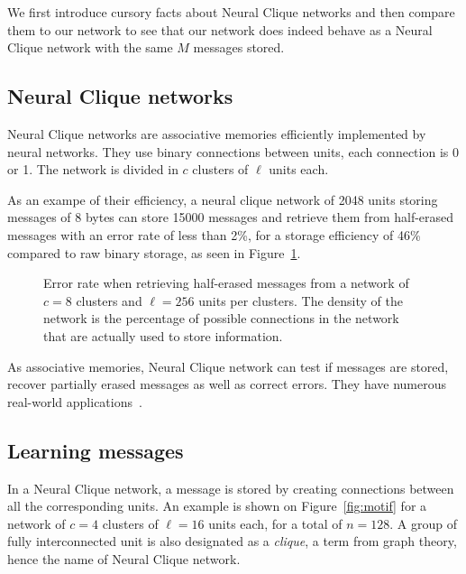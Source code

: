 \documentclass[journal]{IEEEtran}
\begin{document}
We first introduce cursory facts about Neural Clique networks and then compare them to our network to see that our network does indeed behave as a Neural Clique network with the same $M$ messages stored.

\subsection{Neural Clique networks}

Neural Clique networks\cite{gripon2011sparse} are associative memories efficiently implemented by neural networks. They use binary connections between units, each connection is 0 or 1. The network is divided in $c$ clusters of $\ell$ units each. 

As an exampe of their efficiency, a neural clique network of 2048 units storing messages of 8 bytes can store 15000 messages and retrieve them from half-erased messages with an error rate of less than 2\%, for a storage efficiency of 46\% compared to raw binary storage, as seen in Figure~\ref{fig:error}.

\begin{figure}[!h]
\centering

%
\resizebox{1\linewidth}{!}{}
\caption{Error rate when retrieving half-erased messages from a network of $c=8$ clusters and $\ell=256$ units per clusters. The density of the network is the percentage of possible connections in the network that are actually used to store information.}
\label{fig:error}
\end{figure}

As associative memories, Neural Clique network can test if messages are stored, recover partially erased messages as well as correct errors. They have numerous real-world applications~\cite{BogGriSegHei2016,JarOniGriSakSugEndOhnHanGro2014,FerGriJia201607,YuGriJiaJe20153}. 

\subsection{Learning messages}

In a Neural Clique network, a message is stored by creating connections between all the corresponding units. An example is shown on Figure~\ref{fig:motif} for a network of $c=4$ clusters of $\ell=16$ units each, for a total of $n=128$. A group of fully interconnected unit is also designated as a \emph{clique}, a term from graph theory, hence the name of Neural Clique network.
\end{document}
